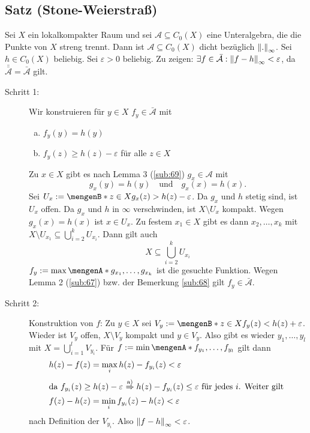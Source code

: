 \subsection{Satz (Stone-Weierstraß)} %
\label{sub:63}
Sei $X$ ein lokalkompakter Raum und sei $\mathcal{A} \subseteq C_0(X)$ eine Unteralgebra, die die Punkte von $X$ streng trennt. Dann ist $\mathcal{A} \subseteq C_0(X)$
dicht bezüglich $\norm[\infty]{.} $.
Sei $h \in C_0(X)$ beliebig. Sei $\varepsilon>0$ beliebig. Zu zeigen: $\exists f \in \bar{\mathcal{A} } : \norm[\infty]{f- h} < \varepsilon $, da 
$\bar{\bar{\mathcal{A}}}= \bar{\mathcal{A}}$ gilt. 
\begin{description}
	\item[Schritt 1:] Wir konstruieren für $y \in X$ $f_y \in \bar{\mathcal{A}}$ mit 
	\begin{enumerate}[a)]
		\item $f_y(y) = h(y)$
		\item $f_y(z) \ge h(z) - \varepsilon$ für alle $z \in X$
	\end{enumerate}
	Zu $x \in X$ gibt es nach Lemma 3 (\ref{sub:69}) $g_x \in \mathcal{A}$ mit 
	\[
		g_x(y) = h(y) \quad \text{und} \quad g_x(x) = h(x).
	\]
	Sei $U_x := \set[z \in X]{g_x(z) > h(z) - \varepsilon}$. Da $g_x$ und $h$ stetig sind, ist $U_x$ offen. Da $g_x$ und $h$ in $\infty$ verschwinden, ist 
	$X \setminus U_x$ kompakt.
	Wegen $g_x(x)= h(x)$ ist $x \in U_x$. Zu festem $x_1 \in X$ gibt es dann $x_2, \ldots , x_k$ mit $X \setminus U_{x_1} \subseteq \bigcup_{i=2}^k U_{x_i}$.
	Dann gilt auch 
	\[
		X \subseteq \bigcup_{i=2}^k U_{x_i}
	\]
	$f_y := \max \set{g_{x_1}, \ldots , g_{x_k}}$ ist die gesuchte Funktion. Wegen Lemma 2 (\ref{sub:67}) bzw. der Bemerkung \ref{sub:68} gilt $f_y \in \bar{\mathcal{A}}$.
	\item[Schritt 2:] Konstruktion von $f$: Zu $y \in X$ sei $V_y := \set[z \in X]{f_y(z) < h(z)+ \varepsilon}$. Wieder ist $V_y$ offen, $X\setminus V_y$ kompakt und
	$y \in V_y$. Also gibt es wieder $y_1, \ldots , y_l$ mit $X = \bigcup_{i=1}^l V_{y_i}$. Für $f := \min \set{f_{y_1}, \ldots , f_{y_l}}$ gilt dann
	\begin{align*}
		h(z) - f(z) &= \max_i h(z)- f_{y_i} (z) < \varepsilon \\
		\intertext{da $f_{y_i}(z) \ge h(z) -\varepsilon$ $\overset{\text{a)}}{\Rightarrow } h(z)- f_{y_i}(z) \le \varepsilon$ für jedes $i$. Weiter gilt }
		f(z)- h(z) &= \min_i f_{y_i}(z)- h(z) < \varepsilon
	\end{align*}
	nach Definition der $V_{y_i}$. Also $\norm[\infty]{f-h} < \varepsilon $. \bewende
\end{description}

